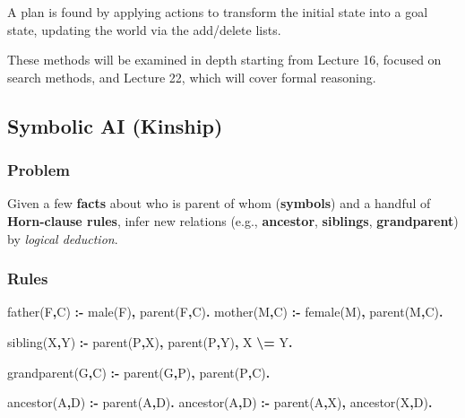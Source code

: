 \documentclass[
  letterpaper,
  DIV=11,
  numbers=noendperiod]{scrartcl}
\newenvironment{Shaded}{\begin{snugshade}}{\end{snugshade}}
\newcommand{\DataTypeTok}[1]{\textcolor[rgb]{0.68,0.00,0.00}{#1}}
\newcommand{\KeywordTok}[1]{\textcolor[rgb]{0.00,0.23,0.31}{\textbf{#1}}}
\newcommand{\NormalTok}[1]{\textcolor[rgb]{0.00,0.23,0.31}{#1}}
\begin{document}
A plan is found by applying actions to transform the initial state into
a goal state, updating the world via the add/delete lists.

These methods will be examined in depth starting from Lecture 16,
focused on search methods, and Lecture 22, which will cover formal
reasoning.

\subsection{Symbolic AI (Kinship)}\label{symbolic-ai-kinship}

\subsubsection{Problem}\label{problem-1}

Given a few \textbf{facts} about who is parent of whom
(\textbf{symbols}) and a handful of \textbf{Horn-clause rules}, infer
new relations (e.g., \textbf{ancestor}, \textbf{siblings},
\textbf{grandparent}) by \emph{logical deduction}.

\subsubsection{Rules}\label{rules-1}

\begin{Shaded}
\begin{Highlighting}[]
\NormalTok{father(}\DataTypeTok{F}\KeywordTok{,}\DataTypeTok{C}\NormalTok{) }\KeywordTok{:{-}}\NormalTok{ male(}\DataTypeTok{F}\NormalTok{)}\KeywordTok{,}\NormalTok{ parent(}\DataTypeTok{F}\KeywordTok{,}\DataTypeTok{C}\NormalTok{)}\KeywordTok{.}
\NormalTok{mother(}\DataTypeTok{M}\KeywordTok{,}\DataTypeTok{C}\NormalTok{) }\KeywordTok{:{-}}\NormalTok{ female(}\DataTypeTok{M}\NormalTok{)}\KeywordTok{,}\NormalTok{ parent(}\DataTypeTok{M}\KeywordTok{,}\DataTypeTok{C}\NormalTok{)}\KeywordTok{.}

\NormalTok{sibling(}\DataTypeTok{X}\KeywordTok{,}\DataTypeTok{Y}\NormalTok{) }\KeywordTok{:{-}}\NormalTok{ parent(}\DataTypeTok{P}\KeywordTok{,}\DataTypeTok{X}\NormalTok{)}\KeywordTok{,}\NormalTok{ parent(}\DataTypeTok{P}\KeywordTok{,}\DataTypeTok{Y}\NormalTok{)}\KeywordTok{,} \DataTypeTok{X} \KeywordTok{\textbackslash{}=} \DataTypeTok{Y}\KeywordTok{.}

\NormalTok{grandparent(}\DataTypeTok{G}\KeywordTok{,}\DataTypeTok{C}\NormalTok{) }\KeywordTok{:{-}}\NormalTok{ parent(}\DataTypeTok{G}\KeywordTok{,}\DataTypeTok{P}\NormalTok{)}\KeywordTok{,}\NormalTok{ parent(}\DataTypeTok{P}\KeywordTok{,}\DataTypeTok{C}\NormalTok{)}\KeywordTok{.}

\NormalTok{ancestor(}\DataTypeTok{A}\KeywordTok{,}\DataTypeTok{D}\NormalTok{) }\KeywordTok{:{-}}\NormalTok{ parent(}\DataTypeTok{A}\KeywordTok{,}\DataTypeTok{D}\NormalTok{)}\KeywordTok{.}
\NormalTok{ancestor(}\DataTypeTok{A}\KeywordTok{,}\DataTypeTok{D}\NormalTok{) }\KeywordTok{:{-}}\NormalTok{ parent(}\DataTypeTok{A}\KeywordTok{,}\DataTypeTok{X}\NormalTok{)}\KeywordTok{,}\NormalTok{ ancestor(}\DataTypeTok{X}\KeywordTok{,}\DataTypeTok{D}\NormalTok{)}\KeywordTok{.}
\end{Highlighting}
\end{Shaded}
\end{document}
